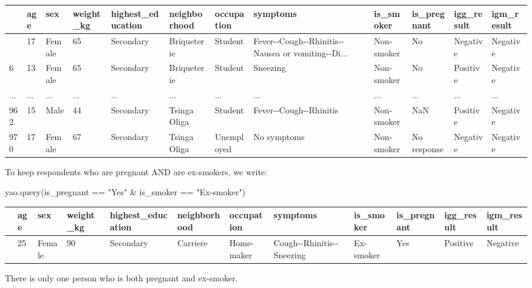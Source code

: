 \documentclass[
  letterpaper,
  DIV=11,
  numbers=noendperiod]{scrreprt}
\newenvironment{Shaded}{\begin{snugshade}}{\end{snugshade}}
\newcommand{\NormalTok}[1]{\textcolor[rgb]{0.00,0.23,0.31}{#1}}
\newcommand{\StringTok}[1]{\textcolor[rgb]{0.13,0.47,0.30}{#1}}
\begin{document}
\begin{longtable}[]{@{}llllllllllll@{}}
\toprule\noalign{}
& age & sex & weight\_kg & highest\_education & neighborhood &
occupation & symptoms & is\_smoker & is\_pregnant & igg\_result &
igm\_result \\
\midrule\noalign{}
\endhead
\bottomrule\noalign{}
\endlastfoot
5 & 17 & Female & 65 & Secondary & Briqueterie & Student &
Fever-\/-Cough-\/-Rhinitis-\/-Nausea or vomiting-\/-Di... & Non-smoker &
No & Negative & Negative \\
6 & 13 & Female & 65 & Secondary & Briqueterie & Student & Sneezing &
Non-smoker & No & Positive & Negative \\
... & ... & ... & ... & ... & ... & ... & ... & ... & ... & ... & ... \\
962 & 15 & Male & 44 & Secondary & Tsinga Oliga & Student &
Fever-\/-Cough-\/-Rhinitis & Non-smoker & NaN & Positive & Negative \\
970 & 17 & Female & 67 & Secondary & Tsinga Oliga & Unemployed & No
symptoms & Non-smoker & No response & Negative & Negative \\
\end{longtable}

To keep respondents who are pregnant AND are ex-smokers, we write:

\begin{Shaded}
\begin{Highlighting}[]
\NormalTok{yao.query(}\StringTok{\textquotesingle{}is\_pregnant == "Yes" \& is\_smoker == "Ex{-}smoker"\textquotesingle{}}\NormalTok{)}
\end{Highlighting}
\end{Shaded}

\begin{longtable}[]{@{}llllllllllll@{}}
\toprule\noalign{}
& age & sex & weight\_kg & highest\_education & neighborhood &
occupation & symptoms & is\_smoker & is\_pregnant & igg\_result &
igm\_result \\
\midrule\noalign{}
\endhead
\bottomrule\noalign{}
\endlastfoot
273 & 25 & Female & 90 & Secondary & Carriere & Home-maker &
Cough-\/-Rhinitis-\/-Sneezing & Ex-smoker & Yes & Positive & Negative \\
\end{longtable}

There is only one person who is both pregnant and ex-smoker.
\end{document}
